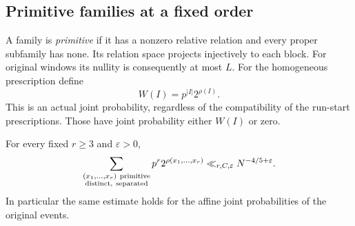 \subsection{Primitive families at a fixed order}

A family is \emph{primitive} if it has a nonzero relative
relation and every proper subfamily has none. Its relation
space projects injectively to each block. For original
windows its nullity is consequently at most \(L\).
For the homogeneous prescription define
\[
 W(I)=p^{|I|}2^{\rho(I)}.
\]
This is an actual joint probability, regardless of the
compatibility of the run-start prescriptions. Those have
joint probability either \(W(I)\) or zero.

\begin{proposition}
\label{p1:fixed:primitive}
For every fixed \(r\ge3\) and \(\varepsilon>0\),
\begin{equation}
 \sum_{\substack{(x_1,\ldots,x_r)\ {\rm primitive}\\
                  {\rm distinct,\ separated}}}
          p^r2^{\rho(x_1,\ldots,x_r)}
        \ll_{r,C,\varepsilon}N^{-4/5+\varepsilon}.
 \label{p1:fixed:primitive-bound}
\end{equation}
In particular the same estimate holds for the affine
joint probabilities of the original events.
\end{proposition}

